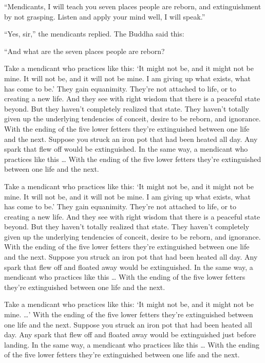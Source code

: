 \documentclass[12pt,openany]{book}%
\begin{document}
“Mendicants, I will teach you seven places people are reborn, and extinguishment by not grasping. Listen and apply your mind well, I will speak.” 

“Yes, sir,” the mendicants replied. The Buddha said this: 

“And what are the seven places people are reborn? 

Take a mendicant who practices like this: ‘It might not be, and it might not be mine. It will not be, and it will not be mine. I am giving up what exists, what has come to be.’ They gain equanimity. They’re not attached to life, or to creating a new life. And they see with right wisdom that there is a peaceful state beyond. But they haven’t completely realized that state. They haven’t totally given up the underlying tendencies of conceit, desire to be reborn, and ignorance. With the ending of the five lower fetters they’re extinguished between one life and the next. Suppose you struck an iron pot that had been heated all day. Any spark that flew off would be extinguished. In the same way, a mendicant who practices like this … With the ending of the five lower fetters they’re extinguished between one life and the next. 

Take a mendicant who practices like this: ‘It might not be, and it might not be mine. It will not be, and it will not be mine. I am giving up what exists, what has come to be.’ They gain equanimity. They’re not attached to life, or to creating a new life. And they see with right wisdom that there is a peaceful state beyond. But they haven’t totally realized that state. They haven’t completely given up the underlying tendencies of conceit, desire to be reborn, and ignorance. With the ending of the five lower fetters they’re extinguished between one life and the next. Suppose you struck an iron pot that had been heated all day. Any spark that flew off and floated away would be extinguished. In the same way, a mendicant who practices like this … With the ending of the five lower fetters they’re extinguished between one life and the next. 

Take a mendicant who practices like this: ‘It might not be, and it might not be mine. …’ With the ending of the five lower fetters they’re extinguished between one life and the next. Suppose you struck an iron pot that had been heated all day. Any spark that flew off and floated away would be extinguished just before landing. In the same way, a mendicant who practices like this … With the ending of the five lower fetters they’re extinguished between one life and the next. 
\end{document}
